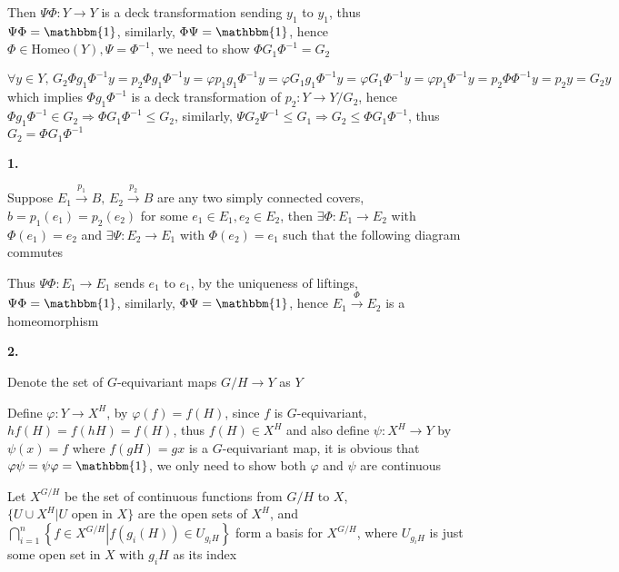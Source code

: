 \documentclass[12pt]{article}
\begin{document}
Then $\Psi\Phi:Y\rightarrow Y$ is a deck transformation sending $y_1$ to $y_1$, thus $\Psi\Phi=\mathbbm{1}$, similarly, $\Phi\Psi=\mathbbm{1}$, hence $\Phi\in\mathrm{Homeo}(Y), \Psi=\Phi^{-1}$, we need to show $\Phi G_1\Phi^{-1}=G_2$ \par
$\forall y\in Y, \, G_2\Phi g_1\Phi^{-1}y=p_2\Phi g_1\Phi^{-1}y=\varphi p_1g_1\Phi^{-1}y=\varphi G_1g_1\Phi^{-1}y=\varphi G_1\Phi^{-1}y=\varphi p_1\Phi^{-1}y=p_2\Phi\Phi^{-1}y=p_2y=G_2y$ which implies $\Phi g_1\Phi^{-1}$ is a deck transformation of $p_2:Y\rightarrow Y/G_2$, hence $\Phi g_1\Phi^{-1}\in G_2 \Rightarrow \Phi G_1\Phi^{-1}\leq G_2$, similarly, $\Psi G_2\Psi^{-1}\leq G_1 \Rightarrow G_2 \leq\Phi G_1\Phi^{-1}$, thus $G_2 =\Phi G_1\Phi^{-1}$ \par
\textbf{1.} \par
Suppose $E_1\overset{p_1}{\rightarrow}B,\,E_2\overset{p_2}{\rightarrow}B$ are any two simply connected covers, $b=p_1(e_1)=p_2(e_2)$ for some $e_1\in E_1,e_2\in E_2$, then $\exists \Phi:E_1\rightarrow E_2$ with $\Phi(e_1)=e_2$ and $\exists \Psi:E_2\rightarrow E_1$ with $\Phi(e_2)=e_1$ such that the following diagram commutes \par
\begin{center}
\end{center}
Thus $\Psi\Phi:E_1\rightarrow E_1$ sends $e_1$ to $e_1$, by the uniqueness of liftings, $\Psi\Phi=\mathbbm{1}$, similarly, $\Phi\Psi=\mathbbm{1}$, hence $E_1\overset{\Phi}{\rightarrow}E_2$ is a homeomorphism \par
\textbf{2.} \par
Denote the set of $G$-equivariant maps $G/H\rightarrow Y$ as $Y$ \par
Define $\varphi:Y\rightarrow X^H$, by $\varphi(f)=f(H)$, since $f$ is $G$-equivariant, $hf(H)=f(hH)=f(H)$, thus $f(H)\in X^H$ and also define $\psi:X^H\rightarrow Y$ by $\psi(x)=f$ where $f(gH)=gx$ is a $G$-equivariant map, it is obvious that $\varphi\psi=\psi\varphi=\mathbbm{1}$, we only need to show both $\varphi$ and $\psi$ are continuous \par
Let $X^{G/H}$ be the set of continuous functions from $G/H$ to $X$, $\{U\cup X^H\left|U \text{ open in } X\right.\}$ are the open sets of $X^H$, and $\displaystyle\bigcap_{i=1}^n\left\{f\in X^{G/H}\left|f(g_i(H))\in U_{g_iH}\right.\right\}$ form a basis for $X^{G/H}$, where $U_{g_iH}$ is just some open set in $X$ with $g_iH$ as its index \par
\end{document}

